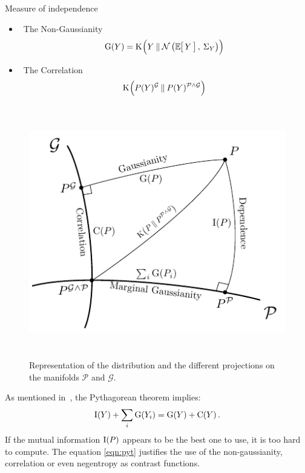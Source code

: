 \documentclass{beamer}
\newcommand{\Kl}[3][]{\mathrm K_{#1}\!\zp{#2\:\|\:#3}}
\newcommand{\zZ}[2]{\mathrm #1\!\zp{#2}}
\newcommand{\zD}{\mathcal}
\newcommand{\Ng}[2]{\mathcal{N}\zp{#1,\:#2}}
\begin{document}
\begin{frame}{}
\begin{columns}[T]
\begin{column}{.48\linewidth}
\begin{block}{Measure of independence}
{\begin{minipage}{.46\textwidth}
\begin{itemize}
\item \ The Non-Gaussianity
\begin{equation}
  \zZ GY = \Kl{Y}{\Ng{\zesp Y}{\Sigma_Y}\zpbig2}
\end{equation}

\item \ The Correlation
\begin{equation}
  \Kl{\zpbig2 P(Y)^{\zD G}}{P(Y)^{\zD P\wedge\zD G}}
\end{equation}
\end{itemize}

\end{minipage}
\hss
\begin{minipage}{.5\textwidth}
\begin{figure}
\label{fig:sketch}
\centering
  \includegraphics[height = 11cm, width=\textwidth]{../figure_tikz/theory_info}
  \caption{Representation of the distribution and the different projections on the manifolds $\zD P$ and $\zD G$.}
\end{figure}
\end{minipage}
}

As mentioned in~\cite{}, the Pythagorean theorem implies:
\begin{equation}
\label{eqn:pyt}
        \zZ IY + \sum_i\zZ G{Y_i} = \zZ GY + \zZ CY.
\end{equation}
If the mutual information $\zZ I P$ appears to be the best one to use, it is too hard to compute.
The equation \ref{eqn:pyt} justifies the use of the non-gaussianity, correlation or even negentropy as contrast functions.


\end{block}
\end{column}
\end{columns}
\end{frame}
\end{document}
